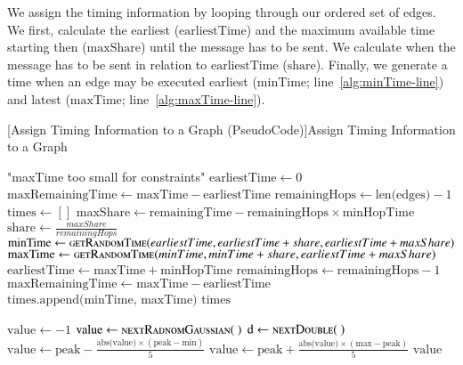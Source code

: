 We assign the timing information by looping through our ordered set of edges. We first, calculate the earliest ($\text{earliestTime}$) and the maximum available time starting then ($\text{maxShare}$) until the message has to be sent. We calculate when the message has to be sent in relation to $\text{earliestTime}$ ($\text{share}$). Finally, we generate a time when an edge may be executed earliest ($\text{minTime}$; line~\ref{alg:minTime-line}) and latest ($\text{maxTime}$; line~\ref{alg:maxTime-line}).


\begin{breakablealgorithm}
	[Assign Timing Information to a Graph (PseudoCode)]{Assign Timing Information to a Graph}\label{alg:simpleTiming}
	\begin{algorithmic}[1]
		\label{alg:getTiming-line}
				\Throw "maxTime too small for constraints"
			\EndIf
			\State $\text{earliestTime} \gets 0$
			\State $\text{maxRemainingTime} \gets \text{maxTime}-\text{earliestTime}$
			\State $\text{remainingHops} \gets \text{len(edges)} - 1$
			\State $\text{times} \gets []$
				\State $\text{maxShare} \gets \text{remainingTime} - \text{remainingHops}\times\text{minHopTime}$
				\State $\text{share} \gets \frac{maxShare}{remainingHops}$
				\State $\text{minTime} \gets \Call{getRandomTime}{earliestTime, earliestTime+share, earliestTime+maxShare}$\label{alg:minTime-line}
				\State $\text{maxTime} \gets \Call{getRandomTime}{minTime, minTime+share, earliestTime+maxShare}$\label{alg:maxTime-line}
				\State $\text{earliestTime} \gets \text{maxTime}+\text{minHopTime}$
				\State $\text{remainingHops} \gets \text{remainingHops} - 1$
				\State $\text{maxRemainingTime} \gets \text{maxTime}-\text{earliestTime}$
				\State $\text{times.append(minTime, maxTime)}$
			\EndFor
			\Return $\text{times}$
		\EndFunction
		\item[]		
		\label{alg:getRandomTime-line}
			\State $\text{value} \gets -1$
				\State $\text{value} \gets \Call{nextRadnomGaussian}{~}$
				\State $\text{d} \gets \Call{nextDouble}{~}$
					\State $\text{value} \gets \text{peak} - \frac{\text{abs(value)} \times (\text{peak} - \text{min})}{5}$
				\Else
					\State $\text{value} \gets \text{peak} + \frac{\text{abs(value)} \times (\text{max} - \text{peak})}{5}$
				\EndIf
			\EndWhile
			\Return $\text{value}$
		\EndFunction
	\end{algorithmic}
\end{breakablealgorithm}

